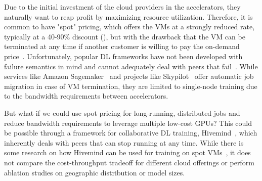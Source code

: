 Due to the initial investment of the cloud providers in the accelerators, they naturally want to reap profit by maximizing resource utilization.
Therefore, it is common to have "spot" pricing, which offers the VMs at a strongly reduced rate, typically at a 40-90\% discount (), but with the drawback that the VM can be terminated at any time if another customer is willing to pay the on-demand price~\cite{portella2019statistical}.
Unfortunately, popular DL frameworks have not been developed with failure semantics in mind and cannot adequately deal with peers that fail~\cite{borzunov2022training}.
While services like Amazon Sagemaker~\cite{das2020sagemaker} and projects like Skypilot~\cite{yang2023skypilot} offer automatic job migration in case of VM termination, they are limited to single-node training due to the bandwidth requirements between accelerators.

But what if we could use spot pricing for long-running, distributed jobs and reduce bandwidth requirements to leverage multiple low-cost GPUs?
This could be possible through a framework for collaborative DL training, Hivemind~\cite{hivemind}, which inherently deals with peers that can stop running at any time.
While there is some research on how Hivemind can be used for training on spot VMs~\cite{ryabinin2021moshpit,diskin2021distributed,ryabinin2023swarm}, it does not compare the cost-throughput tradeoff for different cloud offerings or perform ablation studies on geographic distribution or model sizes.

